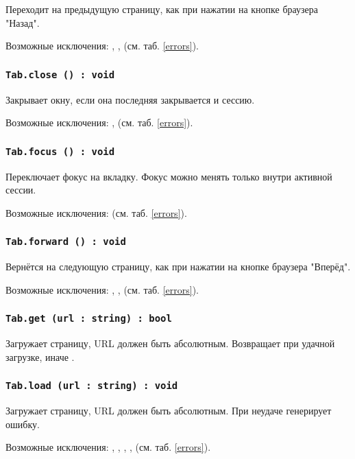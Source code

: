 Переходит на предыдущую страницу, как при нажатии на кнопке браузера "Назад".

Возможные исключения: , ,  (см. таб. \ref{errors}).

\subsubsection{\texttt{Tab.close () : void}}

Закрывает окну, если она последняя закрывается и сессию.

Возможные исключения: ,  (см. таб. \ref{errors}).

\subsubsection{\texttt{Tab.focus () : void}}

Переключает фокус на вкладку. Фокус можно менять только внутри активной сессии.

Возможные исключения:  (см. таб. \ref{errors}).

\subsubsection{\texttt{Tab.forward () : void}}

Вернётся на следующую страницу, как при нажатии на кнопке браузера "Вперёд".

Возможные исключения: , ,  (см. таб. \ref{errors}).

\subsubsection{\texttt{Tab.get (url : string) : bool}}

Загружает страницу, URL должен быть абсолютным. Возвращает \true{} при удачной загрузке, иначе \false.

\subsubsection{\texttt{Tab.load (url : string) : void}}

Загружает страницу, URL должен быть абсолютным. При неудаче генерирует ошибку.

Возможные исключения: , , , ,  (см. таб. \ref{errors}).

